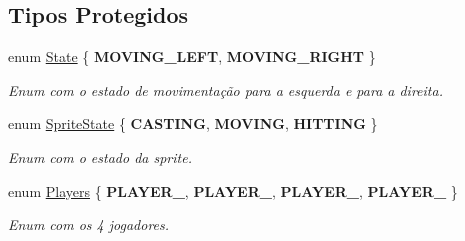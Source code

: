 \subsection*{Tipos Protegidos}
\begin{DoxyCompactItemize}
\item 
\mbox{\label{classFireball_a70306ad9672fafa625fe67c7895cca38}} 
enum \mbox{\hyperlink{classFireball_a70306ad9672fafa625fe67c7895cca38}{State}} \{ {\bfseries M\+O\+V\+I\+N\+G\+\_\+\+L\+E\+FT}, 
{\bfseries M\+O\+V\+I\+N\+G\+\_\+\+R\+I\+G\+HT}
 \}
\begin{DoxyCompactList}\small\item\em Enum com o estado de movimentação para a esquerda e para a direita. \end{DoxyCompactList}\item 
\mbox{\label{classFireball_a5bac3189f4a2d9d0fd1862f77fc8a29d}} 
enum \mbox{\hyperlink{classFireball_a5bac3189f4a2d9d0fd1862f77fc8a29d}{Sprite\+State}} \{ {\bfseries C\+A\+S\+T\+I\+NG}, 
{\bfseries M\+O\+V\+I\+NG}, 
{\bfseries H\+I\+T\+T\+I\+NG}
 \}
\begin{DoxyCompactList}\small\item\em Enum com o estado da sprite. \end{DoxyCompactList}\item 
\mbox{\label{classFireball_a0bc57dc4939ad1cc8b5b0e1653b61825}} 
enum \mbox{\hyperlink{classFireball_a0bc57dc4939ad1cc8b5b0e1653b61825}{Players}} \{ {\bfseries P\+L\+A\+Y\+E\+R\+\_}, 
{\bfseries P\+L\+A\+Y\+E\+R\+\_}, 
{\bfseries P\+L\+A\+Y\+E\+R\+\_}, 
{\bfseries P\+L\+A\+Y\+E\+R\+\_}
 \}
\begin{DoxyCompactList}\small\item\em Enum com os 4 jogadores. \end{DoxyCompactList}\end{DoxyCompactItemize}
